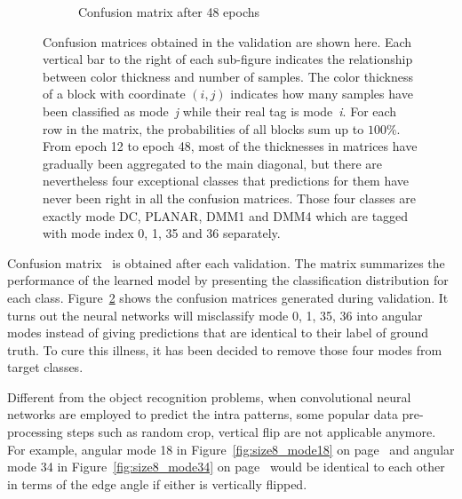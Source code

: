 \begin{figure}
\begin{subfigure}[t]{0.49\textwidth}
        \caption{Confusion matrix after 48 epochs}
        \label{fig:imgd}   
    \end{subfigure}
\caption{Confusion matrices obtained in the validation are shown here.
Each vertical bar to the right of each sub-figure
indicates the relationship between color thickness 
and number of samples.
The color thickness of a block with coordinate \((i,j)\)
indicates how many samples have been classified as mode~\emph{j}
while their real tag is mode~\emph{i}.
For each row in the matrix, 
the probabilities of all blocks sum up to \(100\% \).
From epoch 12 to epoch 48, most of the thicknesses 
in matrices have gradually been aggregated to 
the main diagonal, but there are nevertheless
four exceptional classes that predictions for them
have never been right in all the confusion matrices.
Those four classes are exactly mode DC, PLANAR, 
DMM1 and DMM4 which are tagged with mode index 
0, 1, 35 and 36 separately.}
\label{fig:main}
\end{figure}


Confusion matrix~\parencite{RN216} is obtained after 
each validation.
The matrix summarizes the performance of the 
learned model by presenting the 
classification distribution for each class.
Figure~\ref{fig:main} shows the 
confusion matrices generated during
validation.
It turns out the neural networks will misclassify 
mode 0, 1, 35, 36 into angular modes instead of giving 
predictions that are identical to their label 
of ground truth.
To cure this illness, it has been decided to
remove those four modes from target classes.

Different from the object recognition problems,
when convolutional neural networks are employed to 
predict the intra patterns, some popular data pre-processing
steps such as random crop, vertical flip
are not applicable anymore.
For example, angular mode 18 in Figure~\ref{fig:size8_mode18}
on page~\pageref{fig:size8_mode18} and angular mode 34 in
Figure~\ref{fig:size8_mode34} on page~\pageref{fig:size8_mode34}
would be identical to each other in terms of the edge angle
if either is vertically flipped.

